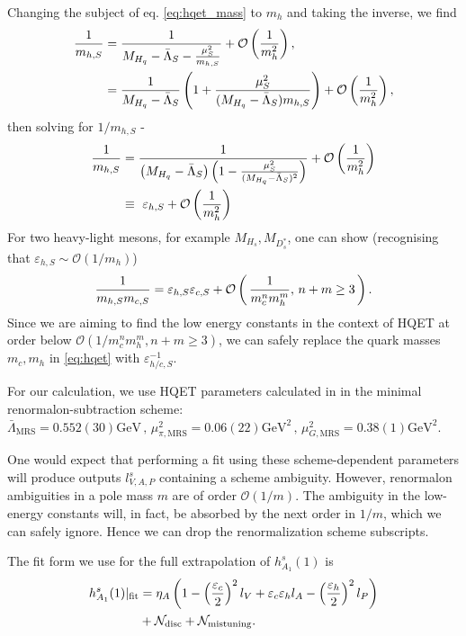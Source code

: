 Changing the subject of eq. \eqref{eq:hqet_mass} to $m_h$ and taking the inverse, we find
\begin{align}
  \nonumber
  {1\over m_{h,S}} &= {1\over M_{H_q} - \bar{\Lambda}_S - { \mu^2_S \over m_{h,S}} } + \mathcal{O}\left({1\over m_h^2}\right), \\
  \nonumber
  &= {1\over M_{H_q} - \bar{\Lambda}_S} \left( 1 + { \mu^2_S \over  ( M_{H_q} - \bar{\Lambda}_S ) m_{h,S}} \right) + \mathcal{O}\left({1\over m_h^2}\right),
\end{align}
then solving for $1/m_{h,S}$ -
\begin{align}
  \nonumber
      {1\over m_{h,S}} &= {1\over \left(M_{H_q} - \bar{\Lambda}_S\right)\left(1 - {\mu^2_S \over (M_{H_q}-\bar{\Lambda}_S)^2}\right)} + \mathcal{O}\left({1\over m_h^2}\right) \\  &\equiv \,\,\varepsilon_{h,S} + \mathcal{O}\left({1\over m_h^2}\right)
      \label{eq:epsilon_q}
\end{align}
For two heavy-light mesons, for example $M_{H_s},M_{D_s^*}$, one can show (recognising that $\varepsilon_{h,S}\sim \mathcal{O}(1/m_h)$)
\begin{align}
  {1\over m_{h,S} m_{c,S}} = \varepsilon_{h,S}\varepsilon_{c,S} + \mathcal{O}\left( \, {1\over m_c^n m_h^m}, \, n+m\geq 3 \, \right).
\end{align}
Since we are aiming to find the low energy constants in the context of HQET at order below $\mathcal{O}( 1/ m_c^n m_h^m, n+m\geq 3 )$, we can safely replace the quark masses $m_c,m_h$ in \eqref{eq:hqet} with $\varepsilon_{h/c,S}^{-1}$.

For our calculation, we use HQET parameters calculated in \cite{Bazavov:2018omf} in the minimal renormalon-subtraction scheme: $\bar{\Lambda}_{\text{MRS}} = 0.552(30)\text{GeV} \,,\, \mu^2_{\pi,\text{MRS}} = 0.06(22)\text{GeV}^2 \,, \, \mu^2_{G,\text{MRS}} = 0.38(1)\text{GeV}^2$.

One would expect that performing a fit using these scheme-dependent parameters will produce outputs $l^s_{V,A,P}$ containing a scheme ambiguity. However, renormalon ambiguities in a pole mass $m$ are of order $\mathcal{O}(1/m)$. The ambiguity in the low-energy constants will, in fact, be absorbed by the next order in $1/m$, which we can safely ignore. Hence we can drop the renormalization scheme subscripts.

The fit form we use for the full extrapolation of $h_{A_1}^s(1)$ is
\begin{align}
  h^s_{A_1}(1)|_{\text{fit}} &= \eta_A \left( 1 - \left({\varepsilon_c\over 2}\right)^2 l_V + {\varepsilon_c\varepsilon_h} l_A- \left({ \varepsilon_h \over 2 }\right)^2 l_P \right) \nonumber \\ &+ \mathcal{N}_{\text{disc}} + \mathcal{N}_{\text{mistuning}}.
  \label{eq:fitform}
\end{align}

